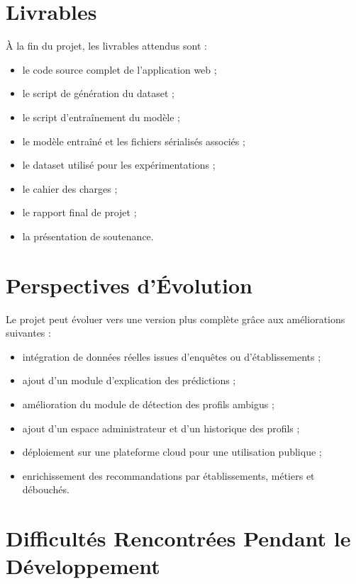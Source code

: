 \documentclass[12pt,a4paper]{report}
\begin{document}
\chapter{Livrables}

À la fin du projet, les livrables attendus sont :
\begin{itemize}[label=--]
    \item le code source complet de l'application web ;
    \item le script de génération du dataset ;
    \item le script d'entraînement du modèle ;
    \item le modèle entraîné et les fichiers sérialisés associés ;
    \item le dataset utilisé pour les expérimentations ;
    \item le cahier des charges ;
    \item le rapport final de projet ;
    \item la présentation de soutenance.
\end{itemize}

\chapter{Perspectives d'Évolution}

Le projet peut évoluer vers une version plus complète grâce aux améliorations suivantes :
\begin{itemize}[label=--]
    \item intégration de données réelles issues d'enquêtes ou d'établissements ;
    \item ajout d'un module d'explication des prédictions ;
    \item amélioration du module de détection des profils ambigus ;
    \item ajout d'un espace administrateur et d'un historique des profils ;
    \item déploiement sur une plateforme cloud pour une utilisation publique ;
    \item enrichissement des recommandations par établissements, métiers et débouchés.
\end{itemize}

\chapter{Difficultés Rencontrées Pendant le Développement}
\end{document}
